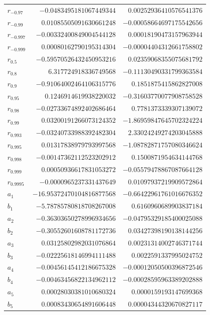 \documentclass[11pt]{article}
\theoremstyle{definition}
\begin{document}
{\begin{longtable}{lrr}
$r_{-0.97}$ & $-0.0483495181067449344$ & $0.00252936410576541376$\\
$r_{-0.99}$ & $0.01085505091630661248$ & $-0.00058664697175542656$\\
$r_{-0.997}$ & $-0.00332400849004544128$ & $0.00018190473157963944$\\
$r_{-0.999}$ & $0.00080162790195314304$ & $-0.00004404312661758802$\\
$r_{0.5}$ & $-0.59570526432450953216$ & $0.02359068355075681792$\\
$r_{0.8}$ & $6.317724918336749568$ & $-0.11130490331799363584$\\
$r_{0.9}$ & $-0.91064002464106315776$ & $0.1851875415862827008$\\
$r_{0.95}$ & $0.1246914619938220032$ & $-0.31603770077908758528$\\
$r_{0.98}$ & $-0.02733674892402686464$ & $0.7781373339307139072$\\
$r_{0.99}$ & $0.03200191266073124352$ & $-1.86959847645702324224$\\
$r_{0.993}$ & $-0.03240733988392482304$ & $2.33024249274203045888$\\
$r_{0.995}$ & $0.01317838979793997568$ & $-1.08782871757080346624$\\
$r_{0.998}$ & $-0.00147362112523202912$ & $0.1500871954634144768$\\
$r_{0.999}$ & $0.00050936617831053272$ & $-0.05579478867087664128$\\
$r_{0.9995}$ & $-0.0000965237331437649$ & $0.01097937219909572864$\\
$a_{1}$ & $-16.95372470104816877568$ & $-0.66422961761016676352$\\
$b_{1}$ & $-5.78785780818708267008$ & $0.6160960689903837184$\\
$a_{2}$ & $-0.36303650278996934656$ & $-0.04795329185400025088$\\
$b_{2}$ & $-0.30552601608781172736$ & $0.03427398190138144256$\\
$a_{3}$ & $0.03125802982031076864$ & $0.00231314002746371744$\\
$b_{3}$ & $-0.02225618146994111488$ & $0.0022591337995024752$\\
$a_{4}$ & $-0.00456145412186675328$ & $-0.00012050500396872546$\\
$b_{4}$ & $-0.00463456822134962112$ & $-0.00028595963389202888$\\
$a_{5}$ & $0.00028030381010680324$ & $0.0000159193147699368$\\
$b_{5}$ & $0.00083430654891606448$ & $0.00004344320670827117$\\

\end{longtable}}
\end{document}
